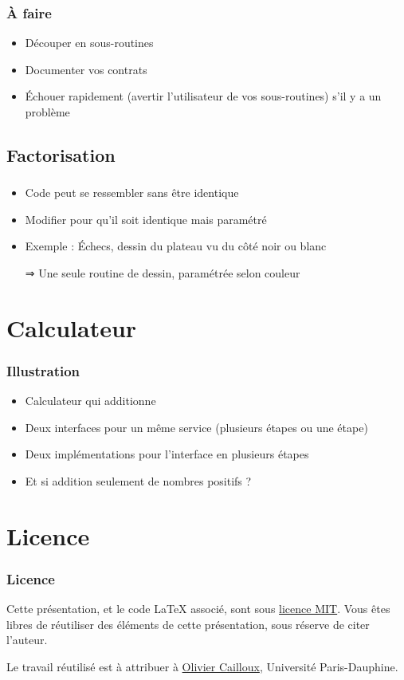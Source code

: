 \documentclass[english, french]{beamer}
\begin{document}
\begin{frame}
	\frametitle{À faire}
	\begin{itemize}
		\item Découper en sous-routines
		\item Documenter vos contrats
		\item Échouer rapidement (avertir l’utilisateur de vos sous-routines) s’il y a un problème
	\end{itemize}
\end{frame}

\subsection{Factorisation}
\begin{frame}
	\frametitle{\subsecname}
	\begin{itemize}
		\item Code peut se ressembler sans être identique
		\item Modifier pour qu’il soit identique mais paramétré
		\item Exemple : Échecs, dessin du plateau vu du côté noir ou blanc
		\item[⇒] Une seule routine de dessin, paramétrée selon couleur
	\end{itemize}
\end{frame}

\section{Calculateur}
\begin{frame}
	\frametitle{Illustration}
	\begin{itemize}
		\item Calculateur qui additionne
		\item Deux interfaces pour un même service (plusieurs étapes ou une étape)
		\item Deux implémentations pour l’interface en plusieurs étapes
		\item Et si addition seulement de nombres positifs ?
	\end{itemize}
\end{frame}

\appendix
\section{Licence}
\begin{frame}
	\frametitle{Licence}
	Cette présentation, et le code LaTeX associé, sont sous \href{http://opensource.org/licenses/MIT}{licence MIT}. Vous êtes libres de réutiliser des éléments de cette présentation, sous réserve de citer l’auteur.
	
	Le travail réutilisé est à attribuer à \href{http://www.lamsade.dauphine.fr/~ocailloux/}{Olivier Cailloux}, Université Paris-Dauphine.
\end{frame}
\end{document}

